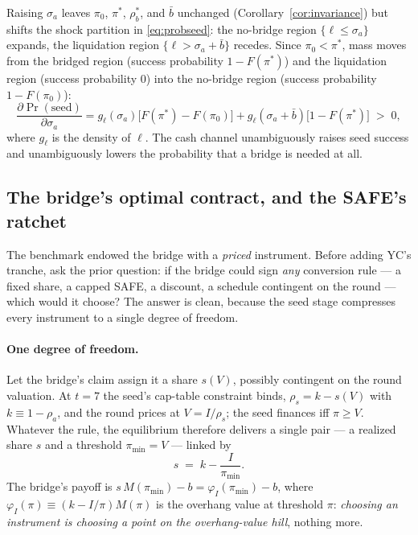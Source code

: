 \documentclass[11pt]{article}
\theoremstyle{definition}
\newcommand{\Prob}{\Pr}
\newcommand{\pimin}{\pi_{\min}}
\begin{document}
Raising $\sigma_a$ leaves $\pi_0$, $\pi^{*}$, $\rho_b^{*}$, and $\bar b$ unchanged (Corollary~\ref{cor:invariance}) but shifts the shock partition in \eqref{eq:probseed}: the no-bridge region $\{\ell \le \sigma_a\}$ expands, the liquidation region $\{\ell > \sigma_a + \bar b\}$ recedes. Since $\pi_0 < \pi^{*}$, mass moves from the bridged region (success probability $1-F(\pi^{*})$) and the liquidation region (success probability $0$) into the no-bridge region (success probability $1-F(\pi_0)$):
\[
\frac{\partial \Prob(\text{seed})}{\partial \sigma_a}
= g_\ell(\sigma_a)\bigl[F(\pi^{*})-F(\pi_0)\bigr]
+ g_\ell(\sigma_a+\bar b)\bigl[1-F(\pi^{*})\bigr] \;>\;0,
\]
where $g_\ell$ is the density of $\ell$. The cash channel unambiguously raises seed success and unambiguously lowers the probability that a bridge is needed at all.

\subsection{The bridge's optimal contract, and the SAFE's ratchet}\label{sec:safebridge}

The benchmark endowed the bridge with a \emph{priced} instrument. Before adding YC's tranche, ask the prior question: if the bridge could sign \emph{any} conversion rule --- a fixed share, a capped SAFE, a discount, a schedule contingent on the round --- which would it choose? The answer is clean, because the seed stage compresses every instrument to a single degree of freedom.

\paragraph{One degree of freedom.} Let the bridge's claim assign it a share $s(V)$, possibly contingent on the round valuation. At $t=7$ the seed's cap-table constraint binds, $\rho_s=k-s(V)$ with $k\equiv1-\rho_a$, and the round prices at $V=I/\rho_s$; the seed finances iff $\pi\ge V$. Whatever the rule, the equilibrium therefore delivers a single pair --- a realized share $s$ and a threshold $\pimin=V$ --- linked by
\[
s \;=\; k-\frac{I}{\pimin}.
\]
The bridge's payoff is $s\,M(\pimin)-b=\varphi_I(\pimin)-b$, where $\varphi_I(\pi)\equiv(k-I/\pi)M(\pi)$ is the overhang value at threshold $\pi$: \emph{choosing an instrument is choosing a point on the overhang-value hill}, nothing more.
\end{document}
